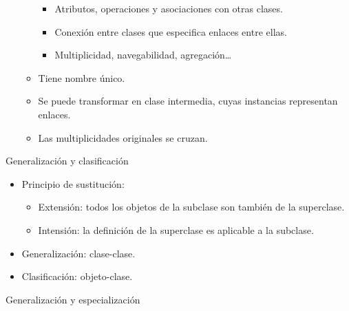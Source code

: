 \documentclass[12pt, twoside, openright]{report} %
\begin{document}
\begin{itemize}
\begin{itemize}
		            \begin{itemize}
			            \item Atributos, operaciones y asociaciones con otras clases.
			            \item Conexión entre clases que especifica enlaces entre ellas.
			            \item Multiplicidad, navegabilidad, agregación\ldots{}
		            \end{itemize}
		      \item Tiene nombre único.
		            \begin{figure}[H]
			            {\def\svgwidth{.8\textwidth}
				            }
		            \end{figure}
		      \item Se puede transformar en clase intermedia, cuyas instancias
		            representan enlaces.
		      \item Las multiplicidades originales se cruzan.
		            \begin{figure}[H]
			            {\def\svgwidth{.8\textwidth}
				            }
		            \end{figure}
	      \end{itemize}
\end{itemize}
\pagebreak
Generalización y clasificación

\begin{itemize}
	\item Principio de sustitución:

	      \begin{itemize}
		      \item Extensión: todos los objetos de la subclase son también de la
		            superclase.
		      \item Intensión: la definición de la superclase es aplicable a la
		            subclase.
	      \end{itemize}
	\item Generalización: clase-clase.
	\item Clasificación: objeto-clase.
\end{itemize}

Generalización y especialización
\end{document}
